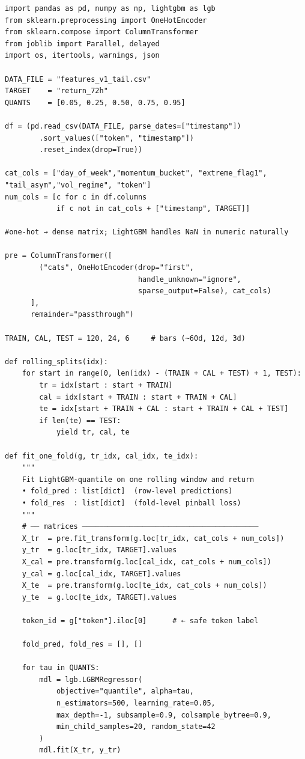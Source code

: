 \documentclass[
  a4paper,
  DIV=11,
  numbers=noendperiod]{scrreprt}
\begin{document}
\begin{verbatim}
import pandas as pd, numpy as np, lightgbm as lgb
from sklearn.preprocessing import OneHotEncoder
from sklearn.compose import ColumnTransformer
from joblib import Parallel, delayed
import os, itertools, warnings, json

DATA_FILE = "features_v1_tail.csv"
TARGET    = "return_72h"
QUANTS    = [0.05, 0.25, 0.50, 0.75, 0.95]

df = (pd.read_csv(DATA_FILE, parse_dates=["timestamp"])
        .sort_values(["token", "timestamp"])
        .reset_index(drop=True))

cat_cols = ["day_of_week","momentum_bucket", "extreme_flag1", "tail_asym","vol_regime", "token"]
num_cols = [c for c in df.columns
            if c not in cat_cols + ["timestamp", TARGET]]

#one-hot → dense matrix; LightGBM handles NaN in numeric naturally

pre = ColumnTransformer([
        ("cats", OneHotEncoder(drop="first",
                               handle_unknown="ignore",
                               sparse_output=False), cat_cols)
      ],
      remainder="passthrough")

TRAIN, CAL, TEST = 120, 24, 6     # bars (~60d, 12d, 3d)

def rolling_splits(idx):
    for start in range(0, len(idx) - (TRAIN + CAL + TEST) + 1, TEST):
        tr = idx[start : start + TRAIN]
        cal = idx[start + TRAIN : start + TRAIN + CAL]
        te = idx[start + TRAIN + CAL : start + TRAIN + CAL + TEST]
        if len(te) == TEST:
            yield tr, cal, te

def fit_one_fold(g, tr_idx, cal_idx, te_idx):
    """
    Fit LightGBM-quantile on one rolling window and return
    • fold_pred : list[dict]  (row-level predictions)
    • fold_res  : list[dict]  (fold-level pinball loss)
    """
    # ── matrices ─────────────────────────────────────────
    X_tr  = pre.fit_transform(g.loc[tr_idx, cat_cols + num_cols])
    y_tr  = g.loc[tr_idx, TARGET].values
    X_cal = pre.transform(g.loc[cal_idx, cat_cols + num_cols])
    y_cal = g.loc[cal_idx, TARGET].values
    X_te  = pre.transform(g.loc[te_idx, cat_cols + num_cols])
    y_te  = g.loc[te_idx, TARGET].values

    token_id = g["token"].iloc[0]      # ← safe token label

    fold_pred, fold_res = [], []

    for tau in QUANTS:
        mdl = lgb.LGBMRegressor(
            objective="quantile", alpha=tau,
            n_estimators=500, learning_rate=0.05,
            max_depth=-1, subsample=0.9, colsample_bytree=0.9,
            min_child_samples=20, random_state=42
        )
        mdl.fit(X_tr, y_tr)


\end{verbatim}
\end{document}
